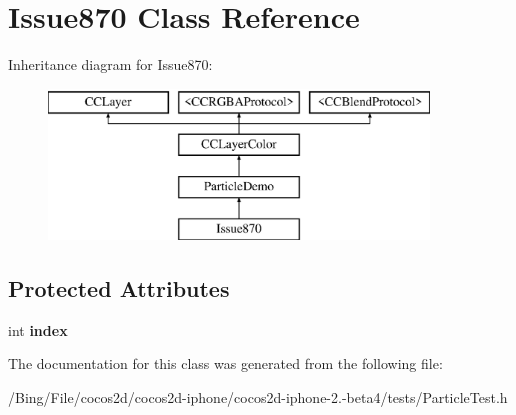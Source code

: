 \hypertarget{interface_issue870}{\section{Issue870 Class Reference}
\label{interface_issue870}
}
Inheritance diagram for Issue870\-:\begin{figure}[H]
\begin{center}
\leavevmode
\includegraphics[height=4.000000cm]{interface_issue870}
\end{center}
\end{figure}
\subsection*{Protected Attributes}
\begin{DoxyCompactItemize}
\item 
\hypertarget{interface_issue870_afaffb39e835bf462946ff0924ca21b01}{int {\bfseries index}}\label{interface_issue870_afaffb39e835bf462946ff0924ca21b01}

\end{DoxyCompactItemize}


The documentation for this class was generated from the following file\-:\begin{DoxyCompactItemize}
\item 
/\-Bing/\-File/cocos2d/cocos2d-\/iphone/cocos2d-\/iphone-\/2.-\/beta4/tests/Particle\-Test.\-h\end{DoxyCompactItemize}
